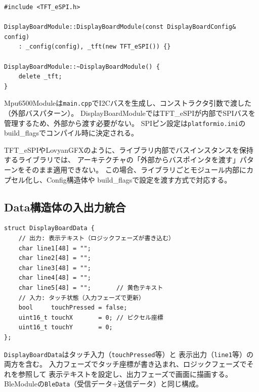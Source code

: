 \begin{lstlisting}[style=cppstyle, caption={DisplayBoardModule.cpp — コンストラクタでTFT\_eSPIを生成}]
#include <TFT_eSPI.h>

DisplayBoardModule::DisplayBoardModule(const DisplayBoardConfig& config)
    : _config(config), _tft(new TFT_eSPI()) {}

DisplayBoardModule::~DisplayBoardModule() {
    delete _tft;
}
\end{lstlisting}

\begin{pointbox}[外部バスパターンとの違い]
Mpu6500Moduleは\texttt{main.cpp}でI2Cバスを生成し、コンストラクタ引数で渡した（外部バスパターン）。
DisplayBoardModuleではTFT\_eSPIが内部でSPIバスを管理するため、外部から渡す必要がない。
SPIピン設定は\texttt{platformio.ini}のbuild\_flagsでコンパイル時に決定される。
\end{pointbox}

\begin{cautionbox}[既存ライブラリの制約]
TFT\_eSPIやLovyanGFXのように、ライブラリ内部でバスインスタンスを保持するライブラリでは、
アーキテクチャの「外部からバスポインタを渡す」パターンをそのまま適用できない。
この場合、ライブラリごとモジュール内部にカプセル化し、Config構造体や
build\_flagsで設定を渡す方式で対応する。
\end{cautionbox}

\subsection{Data構造体の入出力統合}

\begin{lstlisting}[style=cppstyle, caption={DisplayBoardModule.h — Data}]
struct DisplayBoardData {
    // 出力: 表示テキスト（ロジックフェーズが書き込む）
    char line1[48] = "";
    char line2[48] = "";
    char line3[48] = "";
    char line4[48] = "";
    char line5[48] = "";       // 黄色テキスト
    // 入力: タッチ状態（入力フェーズで更新）
    bool     touchPressed = false;
    uint16_t touchX       = 0; // ピクセル座標
    uint16_t touchY       = 0;
};
\end{lstlisting}

\begin{pointbox}
\texttt{DisplayBoardData}はタッチ入力（\texttt{touchPressed}等）と
表示出力（\texttt{line1}等）の両方を含む。
入力フェーズでタッチ座標が書き込まれ、ロジックフェーズでそれを参照して
表示テキストを設定し、出力フェーズで画面に描画する。
BleModuleの\texttt{BleData}（受信データ+送信データ）と同じ構成。
\end{pointbox}

